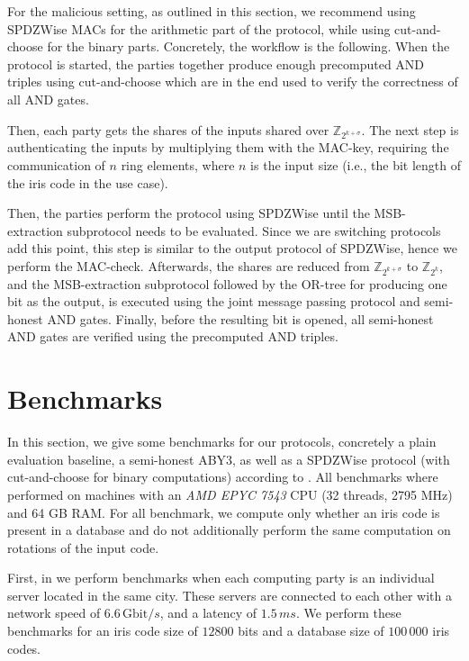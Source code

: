 \documentclass[a4paper,11pt,
]{article}
\newcommand{\Z}{\ensuremath{\mathbb{Z}}\xspace}
\begin{document}
For the malicious setting, as outlined in this section, we recommend using SPDZWise MACs  for the arithmetic part of the protocol, while using cut-and-choose  for the binary parts. Concretely, the workflow is the following. When the protocol is started, the parties together produce enough precomputed AND triples using cut-and-choose which are in the end used to verify the correctness of all AND gates.

Then, each party gets the shares of the inputs shared over $\Z_{2^{k + \sigma}}$. The next step is authenticating the inputs by multiplying them with the MAC-key, requiring the communication of $n$ ring elements, where $n$ is the input size (i.e., the bit length of the iris code in the use case).

Then, the parties perform the protocol using SPDZWise until the MSB-extraction subprotocol needs to be evaluated. Since we are switching protocols add this point, this step is similar to the output protocol of SPDZWise, hence we perform the MAC-check. Afterwards, the shares are reduced from $\Z_{2^{k + \sigma}}$ to $\Z_{2^k}$, and the MSB-extraction subprotocol followed by the OR-tree for producing one bit as the output, is executed using the joint message passing protocol and semi-honest AND gates. Finally, before the resulting bit is opened, all semi-honest AND gates are verified using the precomputed AND triples.


\section{Benchmarks} \label{sec::bench}

In this section, we give some benchmarks for our protocols, concretely a plain evaluation baseline, a semi-honest ABY3, as well as a SPDZWise protocol (with cut-and-choose for binary computations) according to . All benchmarks where performed on machines with an \textit{AMD EPYC 7543} CPU (32 threads, 2795 MHz) and 64 GB RAM. For all benchmark, we compute only whether an iris code is present in a database and do not additionally perform the same computation on rotations of the input code.

First, in  we perform benchmarks when each computing party is an individual server located in the same city. These servers are connected to each other with a network speed of $6.6\,\text{Gbit}/s$, and a latency of $1.5\,ms$. We perform these benchmarks for an iris code size of $12800$ bits and a database size of $100\,000$ iris codes.
\end{document}
